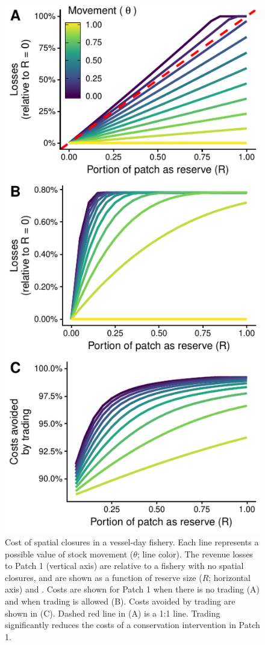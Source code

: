 \documentclass[12pt]{article}
\begin{document}
\begin{figure}[htbp]
\centering
\includegraphics{img/PNA_model.pdf}
\caption{\label{fig:PNA_model}Cost of spatial closures in a vessel-day fishery. Each line represents a possible value of stock movement ($\theta$; line color). The revenue losses to Patch 1 (vertical axis) are relative to a fishery with no spatial closures, and are shown as a function of reserve size ($R$; horizontal axis) and . Costs are shown for Patch 1 when there is no trading (A) and when trading is allowed (B). Costs avoided by trading are shown in (C). Dashed red line in (A) is a 1:1 line. Trading significantly reduces the costs of a conservation intervention in Patch 1.}
\end{figure}
\end{document}
